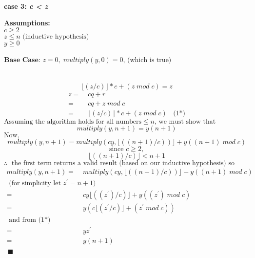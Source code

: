 \begin{minipage}{0.95\textwidth}
\textbf{case 3: \emph{c < z}}
\begin{flushleft}
	\textbf{Assumptions: } \\
	$c \geq 2$ \\
	$z \leq n \text{ (inductive hypothesis) }$ \\
	$y \geq 0$ \\
	\text{} \\
	$\textbf{Base Case: } z = 0, \; multiply(y,0) = 0 \text{, (which is true)}$ \\ 
	\text{} \\
	 \\
	$$\lfloor(z/c)\rfloor*c + (z \;mod\; c) = z $$ 
	\begin{align*}
	z =& \; cq + r \\
	  =& \; cq + z \;mod\; c \\ 
	  =& \; \lfloor(z/c)\rfloor*c + (z \;mod\; c) \;\; \text{ (1*)}
	\end{align*}
	$\text{Assuming the algorithm holds for all numbers}  \leq n  \text{, we must show that  } $ \\
	$$multiply(y, n + 1) = y(n+1) $$
	$\text{Now, }$ \\
	$$multiply(y, n + 1) = multiply(cy, \lfloor((n+1)/c))\rfloor + y((n+1) \;mod\; c) $$
	$$\text{since } c \geq 2, $$
	$$\lfloor((n+1)/c)\rfloor < n + 1 $$
	$$\therefore \; \text{  the first term returns a valid result (based on our inductive hypothesis) so following the algorithm: } $$
	\begin{align*}
	  multiply(y, n + 1) =& \;  multiply(cy, \lfloor((n+1)/c))\rfloor + y((n+1) \;mod\; c)   \\
					    \text{ (for simplicity let } z^{'} = n+1 \text{)} \\
	                     =& \;  cy\lfloor((z^{'})/c)\rfloor + y((z^{'}) \;mod\; c)   \\
	                     =& \; y(c\lfloor(z^{'}/c)\rfloor + (z^{'} \;mod\; c))  \\
	                    \text{ and from (1*) } \\
 	                     =& \;  yz^{'} \\
	                     =& \;  y(n+1) \\
	\end{align*}
	$\;\; \blacksquare$
\end{flushleft}




\end{minipage}
